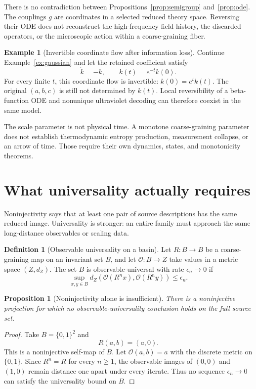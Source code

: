 \documentclass[11pt]{article}
\newtheorem{proposition}[theorem]{Proposition}
\theoremstyle{definition}
\newtheorem{definition}[theorem]{Definition}
\newtheorem{example}[theorem]{Example}
\theoremstyle{remark}
\begin{document}
There is no contradiction between Propositions~\ref{prop:semigroup}
and~\ref{prop:ode}.  The
couplings \(g\) are coordinates in a selected reduced theory space.  Reversing
their ODE does not reconstruct the high-frequency field history, the discarded
operators, or the microscopic action within a coarse-graining fiber.

\begin{example}[Invertible coordinate flow after information loss]
Continue Example~\ref{ex:gaussian} and let the retained coefficient satisfy
\[
 \dot k=-k,
 \qquad
 k(t)=e^{-t}k(0).
\]
For every finite \(t\), this coordinate flow is invertible:
\(k(0)=e^tk(t)\).  The original \((a,b,c)\) is still not determined by
\(k(t)\).  Local reversibility of a beta-function ODE and nonunique
ultraviolet decoding can therefore coexist in the same model.
\end{example}

The scale parameter is not physical time.  A monotone coarse-graining
parameter does not establish thermodynamic entropy production, measurement
collapse, or an arrow of time.  Those require their own dynamics, states, and
monotonicity theorems.

\section{What universality actually requires}
\label{sec:universality}

Noninjectivity says that at least one pair of source descriptions has the same
reduced image.  Universality is stronger: an entire family must approach the
same long-distance observables or scaling data.

\begin{definition}[Observable universality on a basin]
Let \(R:B\to B\) be a coarse-graining map on an invariant set \(B\), and let
\(\mathcal O:B\to Z\) take values in a metric space
\((Z,d_Z)\).  The set \(B\) is observable-universal with rate
\(\epsilon_n\to0\) if
\[
 \sup_{x,y\in B}
 d_Z\!\left(\mathcal O(R^nx),\mathcal O(R^ny)\right)
 \leq\epsilon_n .
\]
\end{definition}

\begin{proposition}[Noninjectivity alone is insufficient]
\label{prop:not-universal}
There is a noninjective projection for which no observable-universality
conclusion holds on the full source set.
\end{proposition}

\begin{proof}
 Take \(B=\{0,1\}^2\) and
 \[
  R(a,b)=(a,0).
 \]
 This is a noninjective self-map of \(B\).  Let
 \(\mathcal O(a,b)=a\) with the discrete metric on \(\{0,1\}\).  Since
 \(R^n=R\) for every \(n\geq1\), the observable images of \((0,0)\) and
 \((1,0)\) remain distance one apart under every iterate.  Thus no sequence
 \(\epsilon_n\to0\) can satisfy the universality bound on \(B\).
\end{proof}
\end{document}

